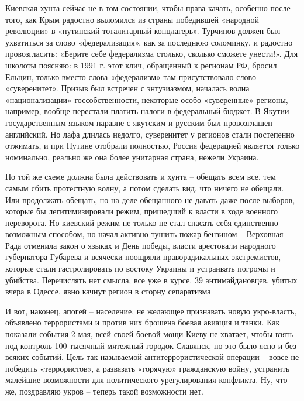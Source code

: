 Киевская хунта сейчас не в том состоянии, чтобы права качать, особенно после
того, как Крым радостно выломился из страны победившей «народной революции» в
«путинский тоталитарный концлагерь». Турчинов должен был ухватиться за слово
«федерализация», как за  последнюю соломинку, и радостно провозгласить: «Берите
себе федерализма столько, сколько сможете унести!». Для школоты поясняю: в 1991
г. этот клич, обращенный к регионам РФ, бросил Ельцин, только вместо слова
«федерализм» там присутствовало слово «суверенитет». Призыв был встречен с
энтузиазмом, началась волна «национализации» госсобственности, некоторые особо
«суверенные» регионы, например, вообще перестали платить налоги в федеральный
бюджет.  В Якутии государственным языком наравне с якутским и русским был
провозглашен английский. Но лафа длилась недолго, суверенитет у регионов стали
постепенно отжимать, и при Путине отобрали полностью, Россия федерацией
является только номинально, реально же она более унитарная страна, нежели
Украина.

По той же схеме должна была действовать и хунта – обещать всем все, тем самым
сбить протестную волну, а потом сделать вид, что ничего не обещали. Или
продолжать обещать, но на деле обещанного не давать даже после выборов, которые
бы легитимизировали режим, пришедший к власти в ходе военного переворота. Но
киевский режим не только не стал спасать себя единственно возможным способом,
но начал активно тушить пожар бензином – Верховная Рада отменила закон о языках
и День победы, власти арестовали народного губернатора Губарева и всячески
поощряли праворадикальных экстремистов, которые стали гастролировать по востоку
Украины и устраивать погромы и убийства. Перечислять нет смысла, все уже в
курсе. 39  антимайдановцев, убитых вчера в Одессе, явно качнут регион в сторну
сепаратизма

И вот, наконец, апогей – население, не желающее признавать новую укро-власть,
объявлено террористами и против них брошена боевая авиация и танки. Как
показали события 2 мая, всей своей боевой мощи Киеву не хватает, чтобы взять
под контроль 100-тысячный мятежный городок Славянск, но это было ясно и без
всяких событий. Цель так называемой антитеррористической операции – вовсе не
победить «террористов», а развязать «горячую» гражданскую войну, устранить
малейшие возможности для политического урегулирования конфликта. Ну, что же,
поздравляю укров – теперь такой возможности нет.

